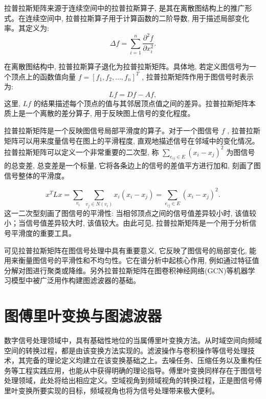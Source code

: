 拉普拉斯矩阵来源于连续空间中的拉普拉斯算子, 是其在离散图结构上的推广形式。在连续空间中, 拉普拉斯算子用于计算函数的二阶导数, 用于描述局部变化率。其定义为:
\begin{equation}
\Delta {f} = \sum\limits_{{i = 1}}^{{n}}\frac{{\partial }^{2}f}{\partial {x}_i^{2}}.
\end{equation}

在离散图结构中, 拉普拉斯算子退化为拉普拉斯矩阵。具体地, 若定义图信号为一个顶点上的函数值向量 \({f} = {\left\lbrack  {f}_1, {f}_2, \ldots , {f}_{n}\right\rbrack  }^{{T}}\) , 拉普拉斯矩阵作用于图信号时表示为:
\begin{equation}
{{Lf}} = {{Df}} - {{Af}}, 
\end{equation}
这里, \({{Lf}}\) 的结果描述每个顶点的值与其邻居顶点值之间的差异。拉普拉斯矩阵本质上是一个离散的差分算子, 用于反映图上信号的变化程度。

拉普拉斯矩阵是一个反映图信号局部平滑度的算子。对于一个图信号 \({f}\) , 拉普拉斯矩阵可以用来度量信号在图上的平滑程度, 直观地描述信号在邻域中的变化情况。拉普拉斯矩阵可以定义一个非常重要的二次型, 称 \(\sum\limits_{{{e}_{ij} \in  E}}{\left( {x}_i - {x}_j\right) }^{2}\) 为图信号的总变差, 总变差是一个标量, 它将各条边上的信号的差值平方进行加和, 刻画了图信号整体的平滑度。

\begin{equation}
{x}^{T}{Lx} = \sum\limits_{{v}_i}\sum\limits_{{{v}_j \in  N\left( {v}_i\right) }}{x}_i\left( {{x}_i - {x}_j}\right)  = \sum\limits_{{{e}_{ij} \in  E}}{\left( {x}_i - {x}_j\right) }^{2}.
\end{equation}
这一二次型刻画了图信号的平滑性: 当相邻顶点之间的信号值差异较小时, 该值较小；当信号值差异较大时, 该值较大。由此可见, 拉普拉斯矩阵是一个用于分析信号平滑度的重要工具。

可见拉普拉斯矩阵在图信号处理中具有重要意义, 它反映了图信号的局部变化, 能用来衡量图信号的平滑性和不均匀性。它在谱分析中起核心作用, 例如通过特征值分解对图进行聚类或降维。另外拉普拉斯矩阵在图卷积神经网络(GCN)等机器学习模型中被广泛用作构建图滤波器的基础。



\section{图傅里叶变换与图滤波器}

数字信号处理领域中，具有基础性地位的当属傅里叶变换方法。从时域空间向频域空间的转换过程，都是由该变换方法实现的。滤波操作与卷积操作等信号处理技术，其完备的理论定义均建立在该变换基础之上。去噪任务、压缩任务以及重构任务等工程实践应用，也能从中获得明确的理论指导。傅里叶变换同样存在于图信号处理领域，此处将给出相应定义。空域视角到频域视角的转换过程，正是图信号傅里叶变换所要实现的目标，频域视角也将为信号处理带来极大便利。

